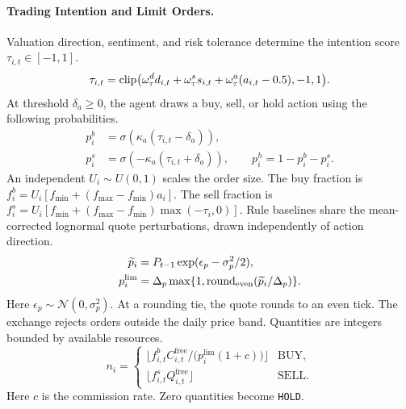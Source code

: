 \paragraph{Trading Intention and Limit Orders.} Valuation direction, sentiment, and risk tolerance determine the intention score $\tau_{i,t}\in[-1,1]$.
\begin{equation}
\tau_{i,t}=\operatorname{clip}\bigl(\omega_\tau^d d_{i,t}+\omega_\tau^s s_{i,t}+\omega_\tau^a(a_{i,t}-0.5),-1,1\bigr).
  \label{eq:intent_score}
\end{equation}
At threshold $\delta_a\ge0$, the agent draws a buy, sell, or hold action using the following probabilities.
\begin{equation}
\begin{split}p_i^b&=\sigma(\kappa_a(\tau_{i,t}-\delta_a)),\\p_i^s&=\sigma(-\kappa_a(\tau_{i,t}+\delta_a)),\qquad p_i^h=1-p_i^b-p_i^s.\end{split}
  \label{eq:action_selection}
\end{equation}
An independent $U_i\sim U(0,1)$ scales the order size. The buy fraction is $f_i^b=U_i[f_{\min}+(f_{\max}-f_{\min})a_i]$. The sell fraction is $f_i^s=U_i[f_{\min}+(f_{\max}-f_{\min})\max(-\tau_i,0)]$. Rule baselines share the mean-corrected lognormal quote perturbations, drawn independently of action direction.
\begin{equation}
\begin{split}\widetilde p_i&=P_{t-1}\exp(\epsilon_p-\sigma_p^2/2),\\p_i^{\rm lim}&=\Delta_p\max\{1,\operatorname{round}_{\rm even}(\widetilde p_i/\Delta_p)\}.\end{split}
  \label{eq:limit_price}
\end{equation}
Here $\epsilon_p\sim\mathcal N(0,\sigma_p^2)$. At a rounding tie, the quote rounds to an even tick. The exchange rejects orders outside the daily price band. Quantities are integers bounded by available resources.
\begin{equation}
  n_i = \begin{cases}
    \bigl\lfloor f^b_{i,t} C_{i,t}^{\mathrm{free}} / \bigl(p_i^{\mathrm{lim}}(1+c)\bigr) \bigr\rfloor & \mathrm{BUY}, \\
    \bigl\lfloor f^s_{i,t} Q_{i,t}^{\mathrm{free}} \bigr\rfloor & \mathrm{SELL}.
  \end{cases}
  \label{eq:order_quantity}
\end{equation}
Here $c$ is the commission rate. Zero quantities become \texttt{HOLD}.

